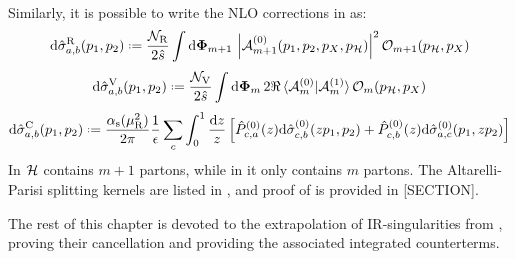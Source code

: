Similarly, it is possible to write the NLO corrections in  as:
\begin{equation}
  \dd\pcs_{a,b}^\text{R}(p_1 , p_2) \defeq \frac{\mathcal{N}_\text{R}}{2\hat{s}} \int \lps_{m+1} \, \abs{\ampl^{(0)}_{m+1}(p_1, p_2, p_X, p_\fs)}^2 \mathcal{O}_{m+1}(p_\fs, p_X)
  \label{eq:real-cs}
\end{equation}
\begin{equation}
  \dd\pcs_{a,b}^\text{V}(p_1 , p_2) \defeq \frac{\mathcal{N}_\text{V}}{2\hat{s}} \int \lps_m \, 2\Re \braket{\ampl_m^{(0)} | \ampl_m^{(1)}} \mathcal{O}_m(p_\fs, p_X)
  \label{eq:virt-cs}
\end{equation}
\begin{equation}
  \dd\pcs_{a,b}^\text{C}(p_1 , p_2) \defeq \frac{\rcr}{2\pi} \frac{1}{\de} \sum_c \int_0^1 \frac{\dd z}{z} \left[ \hat{P}_{c,a}^{(0)}(z) \dd\pcs_{c,b}^{(0)}(z p_1 , p_2) + \hat{P}_{c,b}^{(0)}(z) \dd\pcs_{a,c}^{(0)}(p_1 , z p_2) \right]
  \label{eq:pdf-cs}
\end{equation}
In  $ \mathcal{H} $ contains $ m+1 $ partons, while in  it only contains $ m $ partons. The Altarelli-Parisi splitting kernels are listed in , and proof of  is provided in [SECTION].

The rest of this chapter is devoted to the extrapolation of IR-singularities from , proving their cancellation and providing the associated integrated counterterms.










